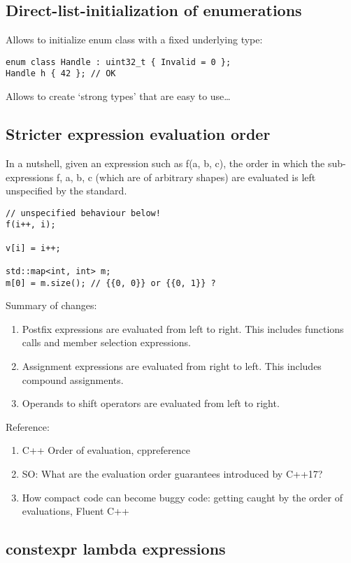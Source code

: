 \subsection{Direct-list-initialization of enumerations}

Allows to initialize enum class with a fixed underlying type:

\begin{verbatim}
enum class Handle : uint32_t { Invalid = 0 };
Handle h { 42 }; // OK
\end{verbatim}

Allows to create ‘strong types’ that are easy to use…

\subsection{Stricter expression evaluation order}

In a nutshell, given an expression such as f(a, b, c), the order in which the sub-expressions f, a, b, c (which are of arbitrary shapes) are evaluated is left unspecified by the standard.
\begin{verbatim}
// unspecified behaviour below!
f(i++, i);

v[i] = i++; 

std::map<int, int> m;
m[0] = m.size(); // {{0, 0}} or {{0, 1}} ?
\end{verbatim}

Summary of changes:
\begin{enumerate}
\item Postfix expressions are evaluated from left to right. This includes functions calls and member selection expressions.
\item Assignment expressions are evaluated from right to left. This includes compound assignments.
\item Operands to shift operators are evaluated from left to right.
\end{enumerate}

Reference:
\begin{enumerate}
\item C++ Order of evaluation, cppreference
\item SO: What are the evaluation order guarantees introduced by C++17?
\item How compact code can become buggy code: getting caught by the order of evaluations, Fluent C++
\end{enumerate}

\subsection{constexpr lambda expressions}

